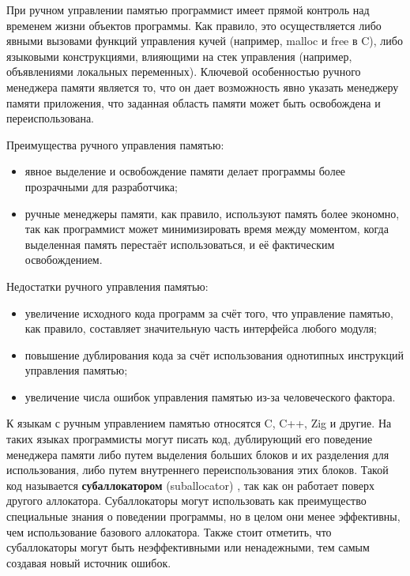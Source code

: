 При ручном управлении памятью программист имеет прямой контроль над временем жизни объектов программы. Как правило, это осуществляется либо явными вызовами функций управления кучей (например, malloc и free в C), либо языковыми конструкциями, влияющими на стек управления (например, объявлениями локальных переменных). Ключевой особенностью ручного менеджера памяти является то, что он дает возможность явно указать менеджеру памяти приложения, что заданная область памяти может быть освобождена и переиспользована.

Преимущества ручного управления памятью: 

\begin{itemize}[label*=---]
	\item явное выделение и освобождение памяти делает программы более прозрачными для разработчика;
	\item ручные менеджеры памяти, как правило, используют память более экономно, так как программист может минимизировать время между моментом, когда выделенная память перестаёт использоваться, и её фактическим освобождением.
\end{itemize}

Недостатки ручного управления памятью: 

\begin{itemize}[label*=---]
	\item увеличение исходного кода программ за счёт того, что управление памятью, как правило, составляет значительную часть интерфейса любого модуля;
	\item повышение дублирования кода за счёт использования однотипных инструкций управления памятью;
	\item увеличение числа ошибок управления памятью из-за человеческого фактора.
\end{itemize}

К языкам с ручным управлением памятью относятся C, C++, Zig и другие. На таких языках программисты могут писать код, дублирующий его поведение менеджера памяти либо путем выделения больших блоков и их разделения для использования, либо путем внутреннего переиспользования этих блоков. Такой код называется \textbf{субаллокатором} (suballocator) \cite{glossary}, так как он работает поверх другого аллокатора. Субаллокаторы могут использовать как преимущество специальные знания о поведении программы, но в целом они менее эффективны, чем использование базового аллокатора. Также стоит отметить, что субаллокаторы могут быть неэффективными или ненадежными, тем самым создавая новый источник ошибок.



